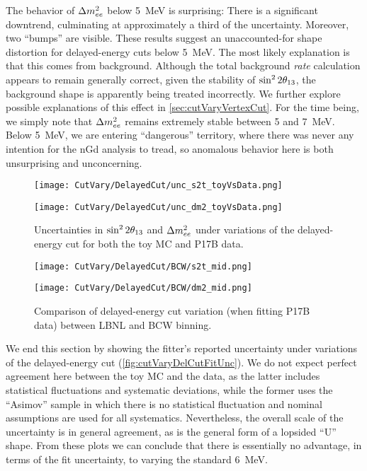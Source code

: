 \documentclass[../thesis.tex]{subfiles}
\begin{document}
The behavior of $\Delta m^2_{ee}$ below 5~MeV is surprising: There is a significant downtrend, culminating at approximately a third of the uncertainty. Moreover, two ``bumps'' are visible. These results suggest an unaccounted-for shape distortion for delayed-energy cuts below 5~MeV. The most likely explanation is that this comes from background. Although the total background \emph{rate} calculation appears to remain generally correct, given the stability of $\sin^2 2\theta_{13}$, the background shape is apparently being treated incorrectly. We further explore possible explanations of this effect in \autoref{sec:cutVaryVertexCut}. For the time being, we simply note that $\Delta m^2_{ee}$ remains extremely stable between 5 and 7~MeV. Below 5~MeV, we are entering ``dangerous'' territory, where there was never any intention for the nGd analysis to tread, so anomalous behavior here is both unsurprising and unconcerning.

\begin{figure}[ht]
  \begin{minipage}{0.5\linewidth}%
    \texttt{[image: CutVary/DelayedCut/unc\_s2t\_toyVsData.png]}%
  \end{minipage}%
  \begin{minipage}{0.5\linewidth}%
    \texttt{[image: CutVary/DelayedCut/unc\_dm2\_toyVsData.png]}%
  \end{minipage}%
  \caption{Uncertainties in $\sin^2 2\theta_{13}$ and $\Delta m^2_{ee}$ under variations of the delayed-energy cut for both the toy MC and P17B data.}
  \label{fig:cutVaryDelCutFitUnc}
\end{figure}

\begin{figure}[ht]
  \begin{minipage}{0.5\linewidth}%
    \texttt{[image: CutVary/DelayedCut/BCW/s2t\_mid.png]}%
  \end{minipage}%
  \begin{minipage}{0.5\linewidth}%
    \texttt{[image: CutVary/DelayedCut/BCW/dm2\_mid.png]}%
  \end{minipage}%
  \caption{Comparison of delayed-energy cut variation (when fitting P17B data) between LBNL and BCW binning.}
  \label{fig:cutVaryDelCutDataResultsBCW}
\end{figure}

We end this section by showing the fitter's reported uncertainty under variations of the delayed-energy cut (\autoref{fig:cutVaryDelCutFitUnc}). We do not expect perfect agreement here between the toy MC and the data, as the latter includes statistical fluctuations and systematic deviations, while the former uses the ``Asimov'' sample in which there is no statistical fluctuation and nominal assumptions are used for all systematics. Nevertheless, the overall scale of the uncertainty is in general agreement, as is the general form of a lopsided ``U'' shape. From these plots we can conclude that there is essentially no advantage, in terms of the fit uncertainty, to varying the standard 6~MeV.
\end{document}
